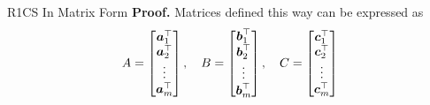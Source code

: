 \documentclass{zkdl-presentation-template}
\begin{document}
    \begin{frame}{R1CS In Matrix Form}
        \textbf{Proof.} Matrices defined this way can be expressed as
        \vspace{-5pt}
        {\scriptsize \begin{equation*}
            A = \begin{bmatrix}
                \boldsymbol{a}_1^{\top} \\ \boldsymbol{a}_2^{\top} \\ \vdots \\ \boldsymbol{a}_m^{\top}
            \end{bmatrix}, \quad B = \begin{bmatrix}
                \boldsymbol{b}_1^{\top} \\ \boldsymbol{b}_2^{\top} \\ \vdots \\ \boldsymbol{b}_m^{\top}
            \end{bmatrix}, \quad C = \begin{bmatrix}
                \boldsymbol{c}_1^{\top} \\ \boldsymbol{c}_2^{\top} \\ \vdots \\ \boldsymbol{c}_m^{\top}
            \end{bmatrix}
            \vspace{-5pt}
        \end{equation*}}
        

\end{frame}
\end{document}

